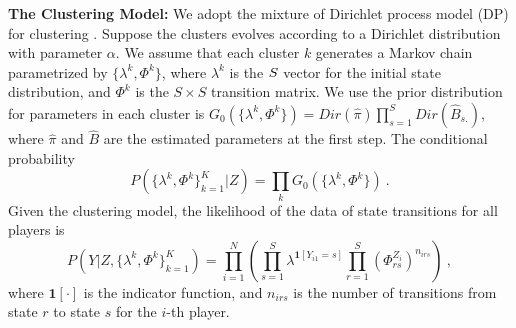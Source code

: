 {\bf The Clustering Model:}
We adopt the mixture of Dirichlet process model (DP) for clustering \cite{dpclustering}. 
Suppose the clusters evolves according to a Dirichlet distribution with parameter $\alpha$.
We assume that each cluster $k$ generates a Markov chain parametrized by $\{\lambda^k, \Phi^k\}$, 
where $\lambda^k$ is the $S\time 1$ vector for the initial state distribution, 
and $\Phi^k$ is the $S \times S$ transition matrix. We use the prior distribution 
for parameters in each cluster is $G_0(\{\lambda^k, \Phi^k\}) = Dir(\hat\pi) \prod_{s=1}^S Dir (\hat B_{s.})$,
where $\hat\pi$ and $\hat B$ are the estimated parameters at the first step. 
The conditional probability  
\begin{equation}
\label{eq:condi}
  P(\{\lambda^k, \Phi^k \}_{k=1}^K | Z ) 
= \prod_k G_0(\{\lambda^k, \Phi^k\})~.
\end{equation}
Given the clustering model, the likelihood of the data of state transitions for all players is
\begin{equation}
\label{eq:likeli}
  P(Y| Z, \{\lambda^k, \Phi^k \}_{k=1}^K) 
= \prod_{i=1}^N \left( \prod_{s=1}^S \lambda^{\mathbf{1}[Y_{i1} = s]} \prod_{r=1}^S \left(\Phi_{rs}^{Z_i}\right)^{n_{irs}} \right)~,
\end{equation}
where $\mathbf{1} [\cdot]$ is the indicator function, and $n_{irs}$ is the number of transitions from state $r$ to state $s$ for the $i$-th player.

